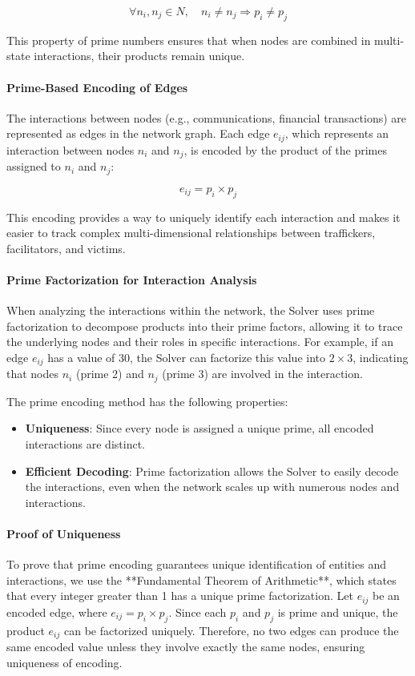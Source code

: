 \documentclass[%
 preprint, linenumbers,
 amsmath,amssymb,
 aps, physrev,
]{revtex4-2}
\begin{document}
\[
\forall n_i, n_j \in N, \quad n_i \neq n_j \Rightarrow p_i \neq p_j
\]

This property of prime numbers ensures that when nodes are combined in multi-state interactions, their products remain unique.

\paragraph{Prime-Based Encoding of Edges}
The interactions between nodes (e.g., communications, financial transactions) are represented as edges in the network graph. Each edge \( e_{ij} \), which represents an interaction between nodes \( n_i \) and \( n_j \), is encoded by the product of the primes assigned to \( n_i \) and \( n_j \):

\[
e_{ij} = p_i \times p_j
\]

This encoding provides a way to uniquely identify each interaction and makes it easier to track complex multi-dimensional relationships between traffickers, facilitators, and victims.

\paragraph{Prime Factorization for Interaction Analysis}
When analyzing the interactions within the network, the Solver uses prime factorization to decompose products into their prime factors, allowing it to trace the underlying nodes and their roles in specific interactions. For example, if an edge \( e_{ij} \) has a value of 30, the Solver can factorize this value into \( 2 \times 3 \), indicating that nodes \( n_i \) (prime 2) and \( n_j \) (prime 3) are involved in the interaction.

The prime encoding method has the following properties:
\begin{itemize}
    \item \textbf{Uniqueness}: Since every node is assigned a unique prime, all encoded interactions are distinct.
    \item \textbf{Efficient Decoding}: Prime factorization allows the Solver to easily decode the interactions, even when the network scales up with numerous nodes and interactions.
\end{itemize}

\paragraph{Proof of Uniqueness}
To prove that prime encoding guarantees unique identification of entities and interactions, we use the **Fundamental Theorem of Arithmetic**, which states that every integer greater than 1 has a unique prime factorization. Let \( e_{ij} \) be an encoded edge, where \( e_{ij} = p_i \times p_j \). Since each \( p_i \) and \( p_j \) is prime and unique, the product \( e_{ij} \) can be factorized uniquely. Therefore, no two edges can produce the same encoded value unless they involve exactly the same nodes, ensuring uniqueness of encoding.
\end{document}
